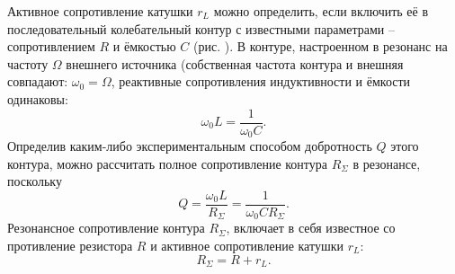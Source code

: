 \documentclass[12pt,a4paper]{article}
\begin{document}
Активное сопротивление катушки $ r_L $ можно определить, если включить её в последовательный колебательный контур с известными параметрами -- сопротивлением $ R $ и ёмкостью $ C $ (рис. ). В контуре, настроенном в резонанс на частоту $ \Omega $ внешнего источника (собственная частота контура и внешняя совпадают: $ \omega_0 = \Omega $, реактивные сопротивления индуктивности и ёмкости одинаковы:
\begin{equation}\label{eq:6}
{\omega _0}L = \frac{1}{{{\omega _0}C}}.
\end{equation}
Определив каким-либо экспериментальным способом добротность $ Q $ этого контура, можно рассчитать полное сопротивление контура $ R_{\Sigma} $ в резонансе, поскольку
\begin{equation}\label{eq:7}
Q = \frac{{{\omega _0}L}}{{{R_\Sigma }}} = \frac{1}{{{\omega _0}C{R_\Sigma }}}.
\end{equation}
Резонансное сопротивление контура $ R_{\Sigma} $, включает в себя известное со противление резистора $ R $ и активное сопротивление катушки $ r_L $:
\begin{equation}\label{eq:8}
{R_\Sigma } = R + {r_L}.
\end{equation}
\end{document}
